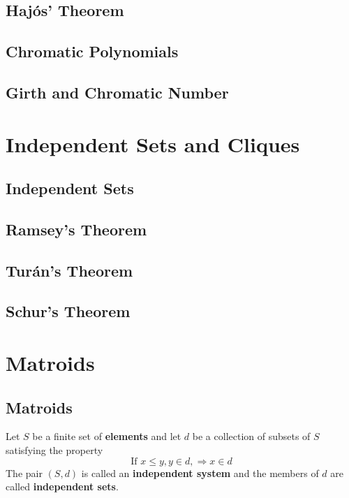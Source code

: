 		\section{Haj\'{o}s' Theorem}

		\section{Chromatic Polynomials}

		\section{Girth and Chromatic Number}

	\chapter{Independent Sets and Cliques}
		\section{Independent Sets}

		\section{Ramsey's Theorem}

		\section{Tur\'{a}n's Theorem}

		\section{Schur's Theorem}

	\chapter{Matroids}
		\section{Matroids}
			\begin{definition}[Matroids]
				Let $S$ be a finite set of \textbf{elements} and let $d$ be a collection of subsets of $S$ satisfying the property
				\begin{equation}
					\text{If } x \le y, y\in d, \Rightarrow x \in d
				\end{equation}
				The pair $(S, d)$ is called an \textbf{independent system} and the members of $d$ are called \textbf{independent sets}.
			\end{definition}

